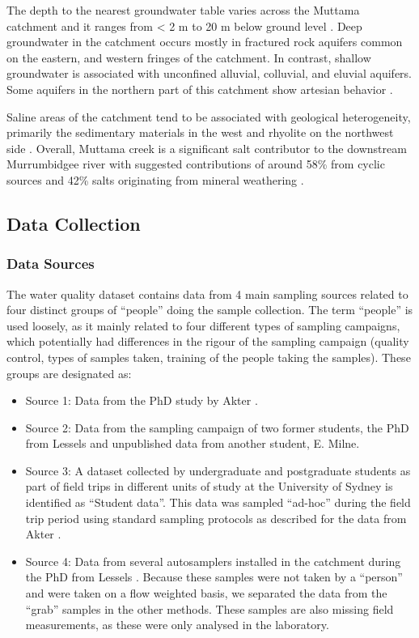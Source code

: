 \documentclass[, manuscript]{copernicus}
\begin{document}
The depth to the nearest groundwater table varies across the Muttama
catchment and it ranges from \textless{} 2 m to 20 m below ground level
\citep{DECC2009}. Deep groundwater in the catchment occurs mostly in
fractured rock aquifers common on the eastern, and western fringes of
the catchment. In contrast, shallow groundwater is associated with
unconfined alluvial, colluvial, and eluvial aquifers. Some aquifers in
the northern part of this catchment show artesian behavior
\citep{Webb1999, Akter2018}.

Saline areas of the catchment tend to be associated with geological
heterogeneity, primarily the sedimentary materials in the west and
rhyolite on the northwest side \citep{Conyers2008}. Overall, Muttama
creek is a significant salt contributor to the downstream Murrumbidgee
river with suggested contributions of around 58\% from cyclic sources
and 42\% salts originating from mineral weathering \citep{Conyers2008}.

\subsection{Data Collection}

\subsubsection{Data Sources}

The water quality dataset contains data from 4 main sampling sources
related to four distinct groups of ``people'' doing the sample
collection. The term ``people'' is used loosely, as it mainly related to
four different types of sampling campaigns, which potentially had
differences in the rigour of the sampling campaign (quality control,
types of samples taken, training of the people taking the samples).
These groups are designated as:

\begin{itemize}
\item
  Source 1: Data from the PhD study by Akter \citeyearpar{Akter2018}.
\item
  Source 2: Data from the sampling campaign of two former students, the
  PhD from Lessels \citeyearpar{Lessels2014} and unpublished data from
  another student, E. Milne.
\item
  Source 3: A dataset collected by undergraduate and postgraduate
  students as part of field trips in different units of study at the
  University of Sydney is identified as ``Student data''. This data was
  sampled ``ad-hoc'' during the field trip period using standard
  sampling protocols as described for the data from Akter
  \citeyearpar{Akter2018}.
\item
  Source 4: Data from several autosamplers installed in the catchment
  during the PhD from Lessels \citeyearpar{Lessels2014}. Because these
  samples were not taken by a ``person'' and were taken on a flow
  weighted basis, we separated the data from the ``grab'' samples in the
  other methods. These samples are also missing field measurements, as
  these were only analysed in the laboratory.
\end{itemize}
\end{document}
